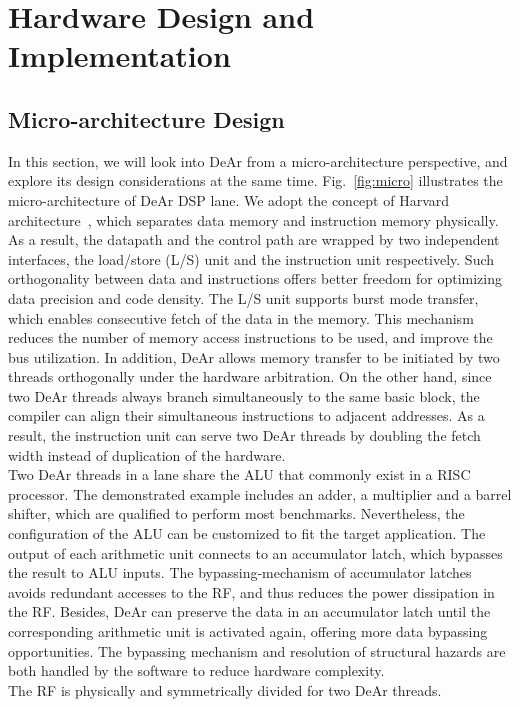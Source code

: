\section{Hardware Design and Implementation}
\subsection{Micro-architecture Design}
In this section, we will look into DeAr from a micro-architecture perspective, and explore its design considerations at the same time.
Fig.~\ref{fig:micro} illustrates the micro-architecture of DeAr DSP lane.
We adopt the concept of Harvard architecture~\cite{harvard}, 
which separates data memory and instruction memory physically.
As a result, the datapath and the control path are wrapped by two independent interfaces, the load/store (L/S) unit and the instruction unit respectively.
Such orthogonality between data and instructions offers better freedom for optimizing data precision and code density.
The L/S unit supports burst mode transfer, which enables consecutive fetch of the data in the memory.
This mechanism reduces the number of memory access instructions to be used, 
and improve the bus utilization.
In addition, DeAr allows memory transfer to be initiated by two threads orthogonally under the hardware arbitration.
On the other hand, since two DeAr threads always branch simultaneously to the same basic block, 
the compiler can align their simultaneous instructions to adjacent addresses.
As a result, the instruction unit can serve two DeAr threads by doubling the fetch width instead of duplication of the hardware.
\\\indent
Two DeAr threads in a lane share the ALU that commonly exist in a RISC processor.
The demonstrated example includes an adder, a multiplier and a barrel shifter, which are qualified to perform most benchmarks.
Nevertheless, the configuration of the ALU can be customized to fit the target application.
The output of each arithmetic unit connects to an accumulator latch, 
which bypasses the result to ALU inputs.
The bypassing-mechanism of accumulator latches avoids redundant accesses to the RF, 
and thus reduces the power dissipation in the RF.
Besides, DeAr can preserve the data in an accumulator latch until the corresponding arithmetic unit is activated again, 
offering more data bypassing opportunities.
The bypassing mechanism and resolution of structural hazards are both handled by the software to reduce hardware complexity.
\\\indent
The RF is physically and symmetrically divided for two DeAr threads.
